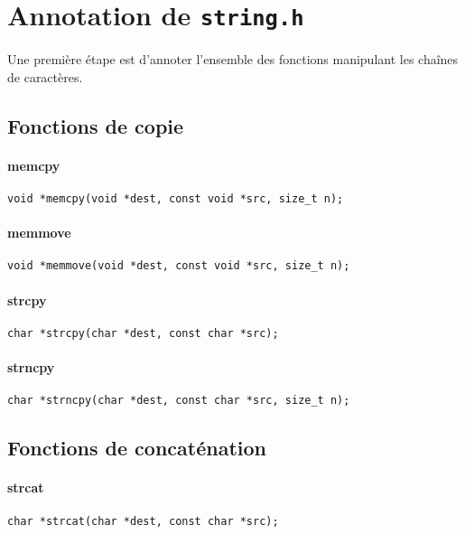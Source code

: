 \section{Annotation de \texttt{string.h}}

Une première étape est d'annoter l'ensemble des fonctions manipulant les chaînes
de caractères.

\subsection{Fonctions de copie}

\paragraph{memcpy}

\begin{Verbatim}
void *memcpy(void *dest, const void *src, size_t n);
\end{Verbatim}

\paragraph{memmove}

\begin{Verbatim}
void *memmove(void *dest, const void *src, size_t n);
\end{Verbatim}

\paragraph{strcpy}

\begin{Verbatim}
char *strcpy(char *dest, const char *src);
\end{Verbatim}

\paragraph{strncpy}

\begin{Verbatim}
char *strncpy(char *dest, const char *src, size_t n);
\end{Verbatim}

\subsection{Fonctions de concaténation}

\paragraph{strcat}
\begin{Verbatim}
char *strcat(char *dest, const char *src);
\end{Verbatim}
